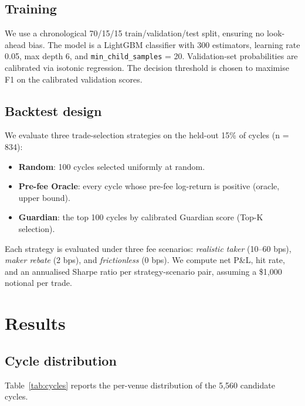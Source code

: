 \documentclass[11pt,a4paper]{article}
\begin{document}
\subsection{Training}
We use a chronological 70/15/15 train/validation/test split, ensuring no look-ahead bias. The model is a LightGBM classifier with 300 estimators, learning rate 0.05, max depth 6, and \texttt{min\_child\_samples} = 20. Validation-set probabilities are calibrated via isotonic regression. The decision threshold is chosen to maximise F1 on the calibrated validation scores.

\subsection{Backtest design}
We evaluate three trade-selection strategies on the held-out 15\% of cycles (n = 834):
\begin{itemize}
    \item \textbf{Random}: 100 cycles selected uniformly at random.
    \item \textbf{Pre-fee Oracle}: every cycle whose pre-fee log-return is positive (oracle, upper bound).
    \item \textbf{Guardian}: the top 100 cycles by calibrated Guardian score (Top-K selection).
\end{itemize}

Each strategy is evaluated under three fee scenarios: \emph{realistic taker} (10--60 bps), \emph{maker rebate} (2 bps), and \emph{frictionless} (0 bps). We compute net P\&L, hit rate, and an annualised Sharpe ratio per strategy-scenario pair, assuming a \$1{,}000 notional per trade.

\section{Results}
\label{sec:results}

\subsection{Cycle distribution}
Table~\ref{tab:cycles} reports the per-venue distribution of the 5{,}560 candidate cycles.
\end{document}

